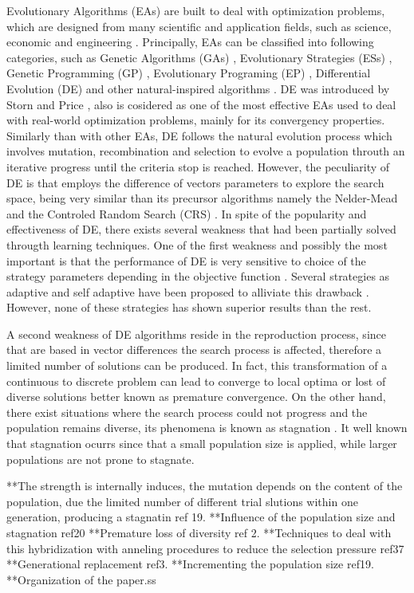 Evolutionary Algorithms (EAs) are built to deal with optimization problems, which are designed from many scientific and application fields, such as science, economic and engineering \cite{noman2008differential, chakraborty2008advances}.
%
Principally, EAs can be classified into following categories, such as Genetic Algorithms (GAs) \cite{srinivas1994genetic, schwefel1977numerische} , Evolutionary Strategies (ESs) \cite{john1992holland}, Genetic Programming (GP) \cite{koza1992genetic}, Evolutionary Programing (EP) \cite{fogel1991meta}, Differential Evolution (DE) \cite{storn1997differential} and other natural-inspired algorithms \cite{das2011differential}.
%
%
DE was introduced by Storn and Price \cite{storn1997differential}, also is cosidered as one of the most effective EAs used to deal with real-world optimization problems, mainly for its convergency properties.
%
Similarly than with other EAs, DE follows the natural evolution process which involves mutation, recombination and selection to evolve a population throuth an iterative progress until the criteria stop is reached.
%
However, the peculiarity of DE is that employs the difference of vectors parameters to explore the search space, being very similar than its precursor algorithms namely the Nelder-Mead \cite{nelder1965simplex} and the Controled Random Search (CRS) \cite{price1983global}.
%
In spite of the popularity and effectiveness of DE, there exists several weakness that had been partially solved througth learning techniques.
%
One of the first weakness and possibly the most important is that the performance of DE is very sensitive to choice of the strategy parameters depending in the objective function \cite{gamperle2002parameter}.
%
Several strategies as adaptive and self adaptive have been proposed to alliviate this drawback \cite{brest2006self, zhang2009jade}.
%
However, none of these strategies has shown superior results than the rest.
%

A second weakness of DE algorithms reside in the reproduction process, since that are based in vector differences the search process is affected, therefore a limited number of solutions can be produced.
%
In fact, this transformation of a continuous to discrete problem can lead to converge to local optima or lost of diverse solutions better known as premature convergence.
%
On the other hand, there exist situations where the search process could not progress and the population remains diverse, its phenomena is known as stagnation \cite{lampinen2000stagnation}.
%
It well known that stagnation ocurrs since that a small population size is applied, while larger populations are not prone to stagnate.

%



**The strength is internally induces, the mutation depends  on the content of the population, due the limited number of different trial slutions within one generation, producing a stagnatin ref 19.
**Influence of the population size and stagnation ref20
**Premature loss of diversity ref 2.
   **Techniques to deal with this hybridization with anneling procedures to reduce the selection pressure ref37
   **Generational replacement ref3.
   **Incrementing the population size ref19.
**Organization of the paper.ss
